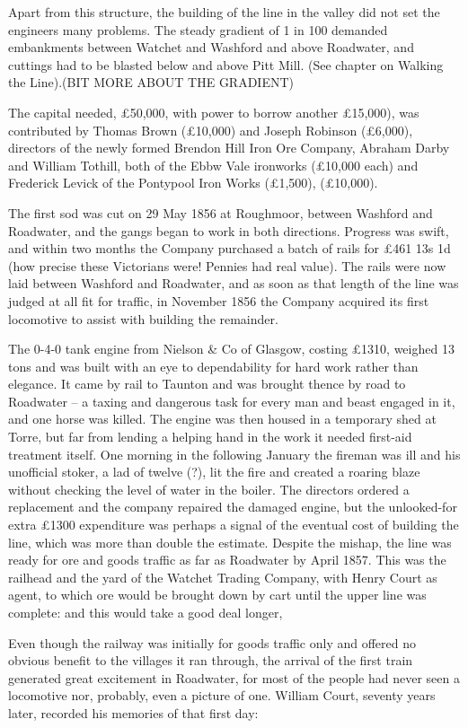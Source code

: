 \documentclass[11pt]{book}
\begin{document}
Apart from this structure, the building of the line in the valley did not set the engineers many problems. The steady gradient of 1 in 100 demanded embankments between Watchet and Washford and above Roadwater, and cuttings had to be blasted below and above Pitt Mill. (See chapter on Walking the Line).(BIT MORE ABOUT THE GRADIENT)

The capital needed, £50,000, with power to borrow another £15,000), was contributed by  Thomas Brown (£10,000) and Joseph Robinson (£6,000), directors of the newly formed Brendon Hill Iron Ore Company, Abraham Darby and William Tothill, both of the Ebbw Vale ironworks (£10,000 each) and Frederick Levick  of the Pontypool Iron Works (£1,500), (£10,000).

The first sod was cut on 29 May 1856 at Roughmoor, between Washford and Roadwater, and the gangs began to work in both directions. Progress was swift, and within two months the Company purchased a batch of rails for £461 13s 1d (how precise these Victorians were! Pennies had real value).  The rails were    now laid between Washford and Roadwater, and as soon as that length of the line was judged at all fit for traffic, in November 1856 the Company acquired its first locomotive to assist with building the remainder.

The 0-4-0 tank engine from Nielson \& Co of Glasgow, costing £1310, weighed 13 tons and was built with an eye to dependability for hard work rather than elegance. It came by rail to Taunton and was brought thence by road to Roadwater – a taxing and dangerous task for every man and   beast engaged in it, and one horse was killed. The engine was then housed in a temporary shed at Torre, but far from lending a helping hand in the work it needed first-aid treatment itself. One morning in the following January the fireman was ill and his unofficial stoker, a lad of twelve (?), lit  the fire and created a roaring blaze without checking the level of water in the boiler. The directors ordered a replacement and the company repaired the damaged engine, but the unlooked-for extra £1300 expenditure was perhaps a signal of the eventual cost of building the line, which was more than double the estimate. Despite the mishap, the line was ready for ore and goods traffic as far as Roadwater by April 1857. This was the railhead and the yard of the Watchet Trading Company, with Henry Court as agent, to which ore would be brought down by cart until the upper line was complete: and this would take a good deal longer,

Even though the railway was initially for goods traffic only and offered no obvious benefit to the villages it ran through, the arrival of the first train generated great excitement in Roadwater, for most of the people had never seen a locomotive nor, probably, even a picture of one.  William Court, seventy years later, recorded his memories of that first day: 
\end{document}
